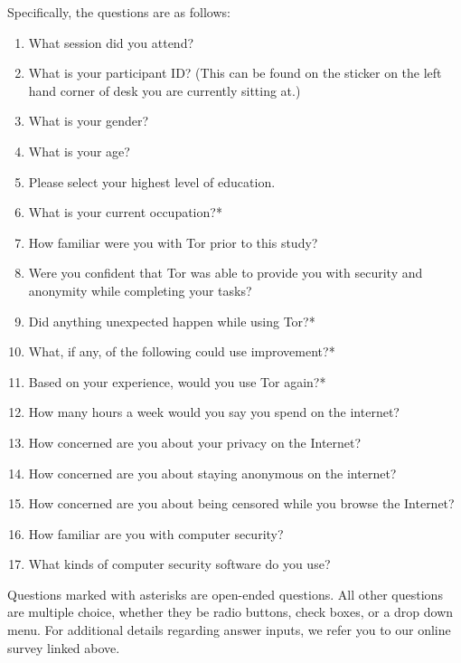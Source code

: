 \documentclass[letterpaper,twocolumn,11pt]{article}
\begin{document}
\noindent Specifically, the questions are as follows: 
\begin{enumerate} \itemsep1pt \parskip0pt 
\item What session did you attend?  
\item What is your participant ID? (This can be found on the sticker on the left hand corner of desk you are currently sitting at.) 
\item What is your gender? 
\item What is your age? 
\item Please select your highest level of education. 
\item What is your current occupation?*
\item How familiar were you with Tor prior to this study? 
\item Were you confident that Tor was able to provide you with security and anonymity while completing your tasks?
\item Did anything unexpected happen while using Tor?*
\item What, if any, of the following could use improvement?*
\item Based on your experience, would you use Tor again?*
\item How many hours a week would you say you spend on the internet? 
\item How concerned are you about your privacy on the Internet?
\item How concerned are you about staying anonymous on the internet?
\item How concerned are you about being censored while you browse the Internet? 
\item How familiar are you with computer security? 
\item What kinds of computer security software do you use? 
\end{enumerate}

Questions marked with asterisks are open-ended questions. All other questions are multiple choice, whether they be radio buttons, check boxes, or a drop down menu. For additional details regarding answer inputs, we refer you to our online survey linked above. 


 
\end{document}
